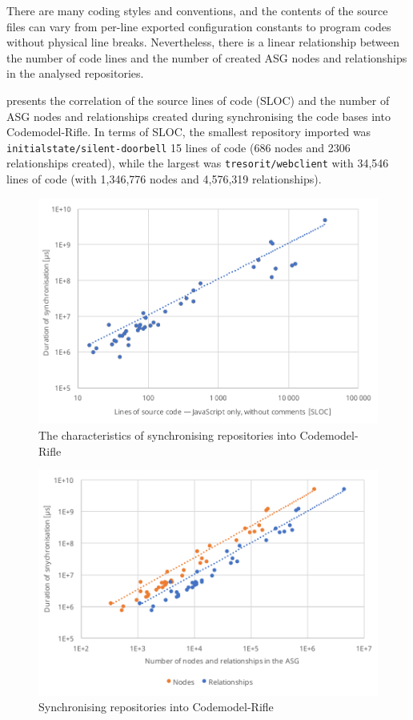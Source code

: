 There are many coding styles and conventions, and the contents of the source files can vary from per-line exported configuration constants to program codes without physical line breaks. Nevertheless, there is a linear relationship between the number of code lines and the number of created ASG nodes and relationships in the analysed repositories.

 presents the correlation of the source lines of code (SLOC) and the number of ASG nodes and relationships created during synchronising the code bases into Codemodel-Rifle. In terms of SLOC, the smallest repository imported was \lstinline{initialstate/silent-doorbell} 15 lines of code (686 nodes and 2306 relationships created), while the largest was \lstinline{tresorit/webclient} with 34,546 lines of code (with 1,346,776 nodes and 4,576,319 relationships).


\begin{figure}[!htb]
	\centerfloat
	\includegraphics[width=\textwidth,clip]{figures/measurement-synctime-sloc.pdf}
	\caption{The characteristics of synchronising repositories into Codemodel-Rifle}
	\label{fig:measurement-synctime-sloc}
\end{figure}

\begin{figure}[!htb]
	\centerfloat
	\includegraphics[width=\textwidth,clip]{figures/measurement-synctime-nodes-relationships.pdf}
	\caption{Synchronising repositories into Codemodel-Rifle}
	\label{fig:measurement-synctime-nodes-relationships}
\end{figure}

